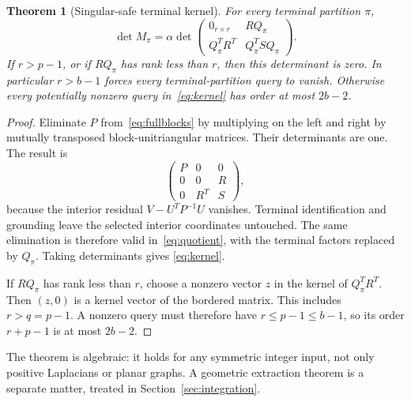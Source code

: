 \documentclass[11pt]{article}
\newtheorem{theorem}{Theorem}[section]
\theoremstyle{definition}
\theoremstyle{remark}
\begin{document}
\begin{theorem}[Singular-safe terminal kernel]\label{thm:kernel}
For every terminal partition $\pi$,
\begin{equation}\label{eq:kernel}
 \det M_\pi=\alpha\det
 \begin{pmatrix}
 0_{r\times r}&R Q_\pi\\
 Q_\pi^T R^T&Q_\pi^T S Q_\pi
 \end{pmatrix}.
\end{equation}
If $r>p-1$, or if $RQ_\pi$ has rank less than $r$, then this determinant is
zero. In particular $r>b-1$ forces every terminal-partition query to vanish.
Otherwise every potentially nonzero query in~\eqref{eq:kernel} has order at
most $2b-2$.
\end{theorem}
\begin{proof}
Eliminate $P$ from~\eqref{eq:fullblocks} by multiplying on the left and right
by mutually transposed block-unitriangular matrices. Their determinants are
one. The result is
\[
 \begin{pmatrix}P&0&0\\0&0&R\\0&R^T&S\end{pmatrix},
\]
because the interior residual $V-U^TP^{-1}U$ vanishes. Terminal
identification and grounding leave the selected interior coordinates
untouched. The same elimination is therefore valid in~\eqref{eq:quotient},
with the terminal factors replaced by $Q_\pi$. Taking determinants gives
\eqref{eq:kernel}.

If $RQ_\pi$ has rank less than $r$, choose a nonzero vector $z$ in the kernel
of $Q_\pi^TR^T$. Then $(z,0)$ is a kernel vector of the bordered matrix.
This includes $r>q=p-1$. A nonzero query must therefore have $r\le p-1\le b-1$,
so its order $r+p-1$ is at most $2b-2$.
\end{proof}

The theorem is algebraic: it holds for any symmetric integer input, not
only positive Laplacians or planar graphs. A geometric extraction theorem
is a separate matter, treated in Section~\ref{sec:integration}.
\end{document}
